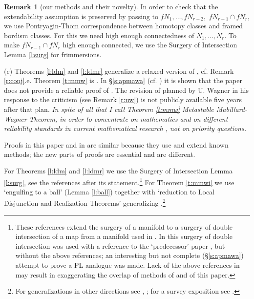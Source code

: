 \documentclass[12pt]{article}
\newcommand{\jonly}[1]{}
\newcommand{\aronly}[1]{#1}
\theoremstyle{plain}
\theoremstyle{definition}
\newtheorem{Remark}[Theorem]{Remark}
\begin{document}
\begin{Remark}[our methods and their novelty]
In order to check that the extendability assumption is preserved by passing to $fN_1,\ldots,fN_{r-2},$ $fN_{r-1}\cap fN_r$, we use Pontryagin-Thom correspondence between homotopy classes and framed bordism classes.
For this we need high enough connectedness of $N_1,\ldots,N_r$.
To make $fN_{r-1}\cap fN_r$ high enough connected, we use the Surgery of Intersection Lemma \ref{l:surg} for frimmersions.


(c) Theorems \ref{l:ldm} and \ref{l:ldmr} generalize a relaxed version of \cite[Lemma 10]{MW16}\aronly{, cf. Remark \ref{r:conj}.e}.
Theorem \ref{t:mmw} is \cite[Theorem 2]{MW16}.
In \aronly{\S\ref{s:apmawa} (cf. \cite{Sk17o})}\jonly{\cite[\S6]{Sk17}} it is shown that the paper \cite{MW16} does not provide a reliable proof of  \cite[Lemma 10 and Theorem 2]{MW16}.
The revision of \cite{MW16} planned by U. Wagner in his response to the criticism (see
\aronly{Remark \ref{r:uw}}\jonly{\cite[Remark 6.2]{Sk17}}) is not publicly available five years after that plan.
{\it In spite of all that I call Theorem \ref{t:mmw} Metastable Mabillard-Wagner Theorem, in order to concentrate on mathematics and on different reliability standards in current mathematical research \cite{Sk21d}, not on priority questions.}

Proofs in this paper and in \cite{MW16} are similar because they use and extend known methods; the new parts of proofs are essential and are different.

For Theorems \ref{l:ldm} and \ref{l:ldmr} we use the Surgery of Intersection Lemma \ref{l:surg}, see the references after its statement.\footnote{These references extend the surgery of a manifold \cite{Mi61} to a surgery of double intersection of a map from a manifold used in \cite[\S4.1]{MW16}.
In \cite[\S4.1]{MW16} this surgery of double intersection was used with a reference to the `predecessor' paper \cite{Mi61}, but without the above references; an interesting but not complete \aronly{(\S\ref{s:apmawa})}\jonly{\cite[\S6]{Sk17}} attempt to prove a PL analogue was made.
Lack of the above references in \cite{MW16} may result in exaggerating the overlap of methods of \cite{MW16} and of this paper.}
For Theorem \ref{t:mmwi} we use `engulfing to a ball' (Lemma \ref{l:ball}) together with `reduction to Local Disjunction and Realization Theorems' generalizing \cite[\S5]{We67}.\aronly{\footnote{\label{f:disj} For generalizations in other directions see \cite[Proposition 2.3]{Sk00}, \cite[the Disjunction Theorem 3.1]{Sk02}; for a survey exposition see \cite[\S8.4]{Sk06}.}}


\end{Remark}
\end{document}
